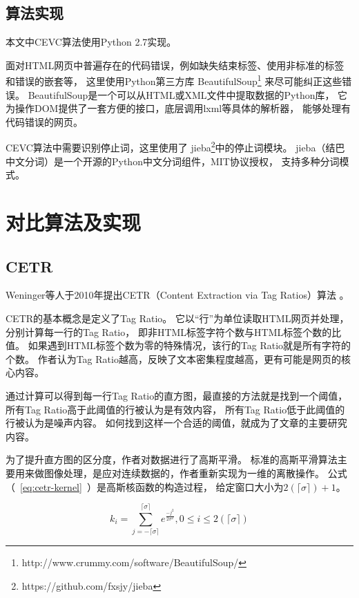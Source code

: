 \subsection{算法实现}
本文中CEVC算法使用Python 2.7实现。

面对HTML网页中普遍存在的代码错误，例如缺失结束标签、使用非标准的标签和错误的嵌套等，
这里使用Python第三方库
BeautifulSoup\footnote{http://www.crummy.com/software/BeautifulSoup/}
来尽可能纠正这些错误。
BeautifulSoup是一个可以从HTML或XML文件中提取数据的Python库，
它为操作DOM提供了一套方便的接口，底层调用lxml等具体的解析器，
能够处理有代码错误的网页。

CEVC算法中需要识别停止词，这里使用了
jieba\footnote{https://github.com/fxsjy/jieba}中的停止词模块。
jieba（结巴中文分词）是一个开源的Python中文分词组件，MIT协议授权，
支持多种分词模式。

\section{对比算法及实现}
\label{sec:cevc-other}

\subsection{CETR}
Weninger等人于2010年提出CETR（Content Extraction via Tag Ratios）算法
。

CETR的基本概念是定义了Tag Ratio。
它以“行”为单位读取HTML网页并处理，分别计算每一行的Tag Ratio，
即非HTML标签字符个数与HTML标签个数的比值。
如果遇到HTML标签个数为零的特殊情况，该行的Tag Ratio就是所有字符的个数。
作者认为Tag Ratio越高，反映了文本密集程度越高，更有可能是网页的核心内容。

通过计算可以得到每一行Tag Ratio的直方图，最直接的方法就是找到一个阈值，
所有Tag Ratio高于此阈值的行被认为是有效内容，
所有Tag Ratio低于此阈值的行被认为是噪声内容。
如何找到这样一个合适的阈值，就成为了文章的主要研究内容。

为了提升直方图的区分度，作者对数据进行了高斯平滑。
标准的高斯平滑算法主要用来做图像处理，是应对连续数据的，作者重新实现为一维的离散操作。
公式（~\ref{eq:cetr-kernel}~）是高斯核函数的构造过程，
给定窗口大小为$2(\lceil \sigma \rceil) + 1$。

\begin{equation}
\label{eq:cetr-kernel}
k_i = \sum_{j=-\lceil \sigma \rceil}^{\lceil \sigma \rceil}
e^{\frac{-j^2}{2\sigma^2}}, 0 \leq i \leq 2(\lceil \sigma \rceil)
\end{equation}

